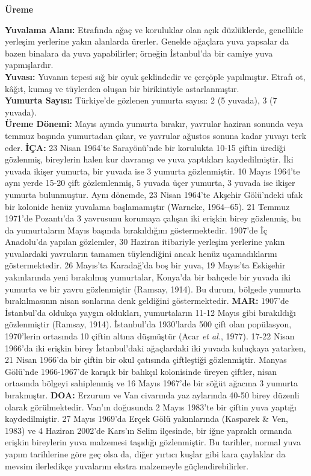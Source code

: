 \documentclass[
  a4paper,
  DIV=11,
  numbers=noendperiod]{scrreprt}
\begin{document}
\textbf{Üreme}

\textbf{Yuvalama Alanı:} Etrafında ağaç ve koruluklar olan açık
düzlüklerde, genellikle yerleşim yerlerine yakın alanlarda ürerler.
Genelde ağaçlara yuva yapsalar da bazen binalara da yuva yapabilirler;
örneğin İstanbul'da bir camiye yuva yapmışlardır.\\
\textbf{Yuvası:} Yuvanın tepesi sığ bir oyuk şeklindedir ve çerçöple
yapılmıştır. Etrafı ot, kâğıt, kumaş ve tüylerden oluşan bir
birikintiyle astarlanmıştır.\\
\textbf{Yumurta Sayısı:} Türkiye'de gözlenen yumurta sayısı: 2 (5
yuvada), 3 (7 yuvada).\\
\textbf{Üreme Dönemi:} Mayıs ayında yumurta bırakır, yavrular haziran
sonunda veya temmuz başında yumurtadan çıkar, ve yavrular ağustos sonuna
kadar yuvayı terk eder. \textbf{İÇA:} 23 Nisan 1964'te Sarayönü'nde bir
korulukta 10-15 çiftin ürediği gözlenmiş, bireylerin halen kur davranışı
ve yuva yaptıkları kaydedilmiştir. İki yuvada ikişer yumurta, bir yuvada
ise 3 yumurta gözlenmiştir. 10 Mayıs 1964'te aynı yerde 15-20 çift
gözlemlenmiş, 5 yuvada üçer yumurta, 3 yuvada ise ikişer yumurta
bulunmuştur. Aynı dönemde, 23 Nisan 1964'te Akşehir Gölü'ndeki ufak bir
kolonide henüz yuvalama başlamamıştır (Warncke, 1964-\/-65). 21 Temmuz
1971'de Pozantı'da 3 yavrusunu korumaya çalışan iki erişkin birey
gözlenmiş, bu da yumurtaların Mayıs başında bırakıldığını
göstermektedir. 1907'de İç Anadolu'da yapılan gözlemler, 30 Haziran
itibariyle yerleşim yerlerine yakın yuvalardaki yavruların tamamen
tüylendiğini ancak henüz uçamadıklarını göstermektedir. 26 Mayıs'ta
Karadağ'da boş bir yuva, 19 Mayıs'ta Eskişehir yakınlarında yeni
bırakılmış yumurtalar, Konya'da bir bahçede bir yuvada iki yumurta ve
bir yavru gözlenmiştir (Ramsay, 1914). Bu durum, bölgede yumurta
bırakılmasının nisan sonlarına denk geldiğini göstermektedir.
\textbf{MAR:} 1907'de İstanbul'da oldukça yaygın oldukları, yumurtaların
11-12 Mayıs gibi bırakıldığı gözlenmiştir (Ramsay, 1914). İstanbul'da
1930'larda 500 çift olan popülasyon, 1970'lerin ortasında 10 çiftin
altına düşmüştür (Acar \emph{et al.}, 1977). 17-22 Nisan 1966'da iki
erişkin birey İstanbul'daki ağaçlardaki iki yuvada kuluçkaya yatarken,
21 Nisan 1966'da bir çiftin bir okul çatısında çiftleştiği gözlenmiştir.
Manyas Gölü'nde 1966-1967'de karışık bir balıkçıl kolonisinde üreyen
çiftler, nisan ortasında bölgeyi sahiplenmiş ve 16 Mayıs 1967'de bir
söğüt ağacına 3 yumurta bırakmıştır. \textbf{DOA:} Erzurum ve Van
civarında yaz aylarında 40-50 birey düzenli olarak görülmektedir. Van'ın
doğusunda 2 Mayıs 1983'te bir çiftin yuva yaptığı kaydedilmiştir. 27
Mayıs 1969'da Erçek Gölü yakınlarında (Kasparek \& Ven, 1983) ve 4
Haziran 2002'de Kars'ın Selim ilçesinde, bir iğne yapraklı ormanda
erişkin bireylerin yuva malzemesi taşıdığı gözlenmiştir. Bu tarihler,
normal yuva yapım tarihlerine göre geç olsa da, diğer yırtıcı kuşlar
gibi kara çaylaklar da mevsim ilerledikçe yuvalarını ekstra malzemeyle
güçlendirebilirler.
\end{document}
